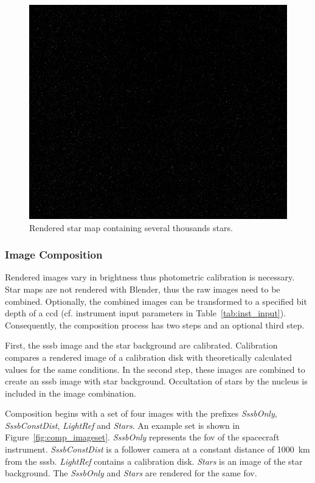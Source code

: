 \begin{figure}[htb]
    \centering
    \includegraphics[width=\textwidth]{doc/thesis/0_figures/star_rendering/Stars_2017-08-15T115856-171000.png}
    \caption{Rendered star map containing several thousands stars.}
    \label{fig:star_rendering}
\end{figure}

\subsubsection{Image Composition} \label{sec:composition}
Rendered images vary in brightness thus photometric calibration is necessary. Star maps are not rendered with Blender, thus the raw images need to be combined. Optionally, the combined images can be transformed to a specified bit depth of a \gls{ccd} (cf. instrument input parameters in Table~\ref{tab:inst_input}). Consequently, the composition process has two steps and an optional third step. 

First, the \gls{sssb} image and the star background are calibrated. Calibration compares a rendered image of a calibration disk with theoretically calculated values for the same conditions.  In the second step, these images are combined to create an \gls{sssb} image with star background. Occultation of stars by the nucleus is included in the image combination.

Composition begins with a set of four images with the prefixes \textit{SssbOnly}, \textit{SssbConstDist}, \textit{LightRef} and \textit{Stars}. An example set is shown in Figure~\ref{fig:comp_imageset}. \textit{SssbOnly} represents the \gls{fov} of the spacecraft instrument. \textit{SssbConstDist} is a follower camera at a constant distance of \SI{1000}{\kilo\meter} from the \gls{sssb}. \textit{LightRef} contains a calibration disk. \textit{Stars} is an image of the star background. The \textit{SssbOnly} and \textit{Stars} are rendered for the same \gls{fov}.

